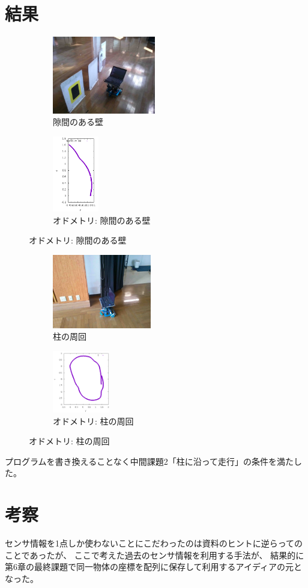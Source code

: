 \documentclass[main]{subfiles}
\begin{document}
\section{結果}
\begin{figure}[H]
	\begin{minipage}{0.5\hsize}
		\begin{figure}[H]
			\centering
			\includegraphics[width=4.5cm]{img/photo_wall.jpg}
			\caption{隙間のある壁}
		\end{figure}
	\end{minipage}
	\begin{minipage}{0.5\hsize}
		\begin{figure}[H]
			\centering
			\includegraphics[width=2cm]{img/sukima.png}
			\caption{オドメトリ: 隙間のある壁}
		\end{figure}
	\end{minipage}
\end{figure}
\begin{figure}[H]
	\begin{minipage}{0.5\hsize}
		\begin{figure}[H]
			\centering
			\includegraphics[width=4.3cm]{img/photo_pillar.jpg}
			\caption{柱の周回}
		\end{figure}
	\end{minipage}
	\begin{minipage}{0.5\hsize}
		\begin{figure}[H]
			\centering
			\includegraphics[width=2.5cm]{img/pillar.png}
			\caption{オドメトリ: 柱の周回}
		\end{figure}
	\end{minipage}
\end{figure}

プログラムを書き換えることなく中間課題2「柱に沿って走行」の条件を満たした。

\section{考察}
センサ情報を1点しか使わないことにこだわったのは資料のヒントに逆らってのことであったが、
ここで考えた過去のセンサ情報を利用する手法が、
結果的に第6章の最終課題で同一物体の座標を配列に保存して利用するアイディアの元となった。
\end{document}
